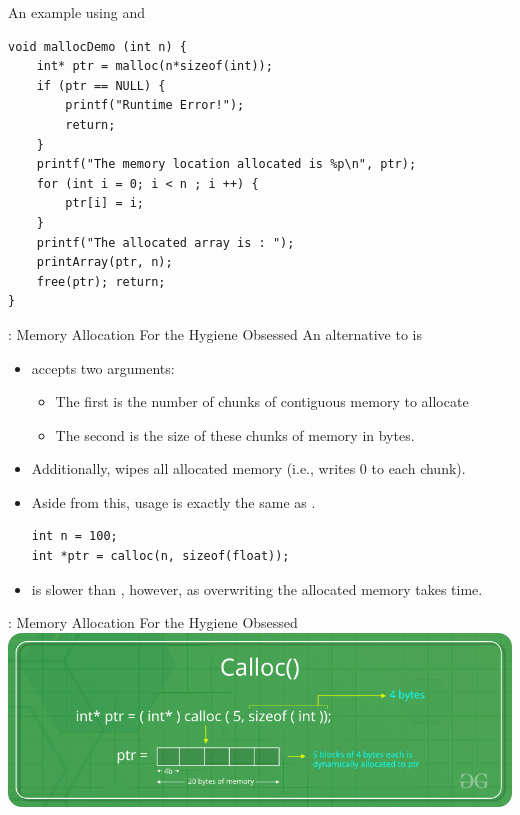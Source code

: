 \documentclass[11pt]{beamer}
\let\OldTexttt\texttt
\renewcommand{\texttt}[1]{\OldTexttt{\color{teal}{#1}}}
\begin{document}
\begin{frame}[fragile=singleslide]{An example using \texttt{malloc()} and \texttt{free()}}
\begin{lstlisting}[style = C]
void mallocDemo (int n) {
	int* ptr = malloc(n*sizeof(int));
	if (ptr == NULL) {
		printf("Runtime Error!"); 
		return; 
	}
	printf("The memory location allocated is %p\n", ptr);
	for (int i = 0; i < n ; i ++) { 
		ptr[i] = i; 
	}
	printf("The allocated array is : ");
	printArray(ptr, n);
	free(ptr); return;
}
\end{lstlisting}
\end{frame}

\begin{frame}[fragile=singleslide]{\texttt{calloc()} : Memory Allocation For the Hygiene Obsessed}
An alternative to \texttt{malloc()} is \texttt{calloc()}
\begin{itemize}
\item \texttt{calloc()} accepts two arguments:
\begin{itemize}
\item The first is the number of chunks of contiguous memory to allocate
\item The second is the size of these chunks of memory in bytes.  
\end{itemize}
\item Additionally, \texttt{calloc()} wipes all allocated memory (i.e., writes 0 to each chunk).
\item Aside from this, usage is exactly the same as \texttt{malloc()}.
\begin{lstlisting}[style = C]
int n = 100;
int *ptr = calloc(n, sizeof(float));
\end{lstlisting}
\item \texttt{calloc()} is slower than \texttt{malloc()}, however, as overwriting the allocated memory takes time.  
\end{itemize}
\end{frame}

\begin{frame}{\texttt{calloc()} : Memory Allocation For the Hygiene Obsessed}
\center
\includegraphics[scale=0.35]{calloc-function-in-c.png}
\end{frame}
\end{document}
